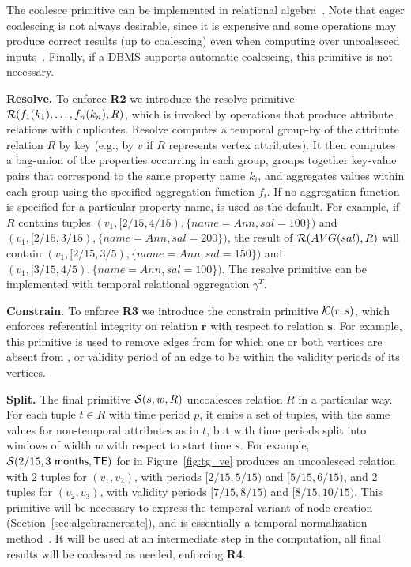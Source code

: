 The coalesce primitive can be implemented in relational
algebra~\cite{DBLP:conf/vldb/BohlenSS96}.  Note that eager coalescing
is not always desirable, since it is expensive and some operations may
produce correct results (up to coalescing) even when computing over
uncoalesced inputs~\cite{DBLP:reference/db/Bohlen09}.  Finally, if a
DBMS supports automatic coalescing, this primitive is not necessary.

{\bf Resolve.} To enforce {\bf R2} we introduce the resolve primitive
$\mathcal{R}(f_1(k_1), \ldots, f_n(k_n),R)$, which is invoked by
operations that produce attribute relations with duplicates.  Resolve
computes a temporal group-by of the attribute relation $R$ by key
(e.g., by $v$ if $R$ represents vertex attributes).  It then computes
a bag-union of the properties occurring in each group, groups together
key-value pairs that correspond to the same property name $k_i$, and
aggregates values within each group using the specified aggregation
function $f_i$.  If no aggregation function is specified for a
particular property name,  is used as the default.  For
example, if $R$ contains tuples $(v_1, [2/15,4/15),
  \{name=Ann,sal=100\})$ and $(v_1, [2/15, 3/15),
    \{name=Ann,sal=200\})$, the result of $\mathcal{R}(AVG(sal),R)$ will
    contain $(v_1, [2/15,3/5), \{name=Ann,sal=150\})$ and $(v_1,
      [3/15,4/5), \{name=Ann,sal=100\})$.  The resolve primitive can
        be implemented with temporal relational aggregation
        $\gamma^T$.

{\bf Constrain.} To enforce {\bf R3} we introduce the constrain
primitive $\mathcal{K}(r,s)$, which enforces referential integrity on
relation $\mathbf{r}$ with respect to relation $\mathbf{s}$.  For
example, this primitive is used to remove edges from \te for which one
or both vertices are absent from \tv, or validity period of an edge to
be within the validity periods of its vertices.  

{\bf Split.} The final primitive $\mathcal{S}(s,w,R)$ uncoalesces
relation $R$ in a particular way.  For each tuple $t \in R$ with time
period $p$, it emits a set of tuples, with the same values for
non-temporal attributes as in $t$, but with time periods split into
windows of width $w$ with respect to start time $s$.  For example,
$\mathcal{S}(2/15,3~\textsf{months},\textsf{TE})$ for  in
Figure~\ref{fig:tg_ve} produces an uncoalesced relation with 2 tuples
for $(v_1, v_2)$, with periods $[2/15, 5/15)$ and $[5/15, 6/15)$, and
    2 tuples for $(v_2, v_3)$, with validity periods $[7/15, 8/15)$
      and $[8/15, 10/15)$.  This primitive will be necessary to
        express the temporal variant of node creation
        (Section~\ref{sec:algebra:ncreate}), and is essentially a
        temporal normalization
        method~\cite{DBLP:conf/time/BohlenGJ06}.  It will be used at
        an intermediate step in the computation, all final results
        will be coalesced as needed, enforcing {\bf R4}.

